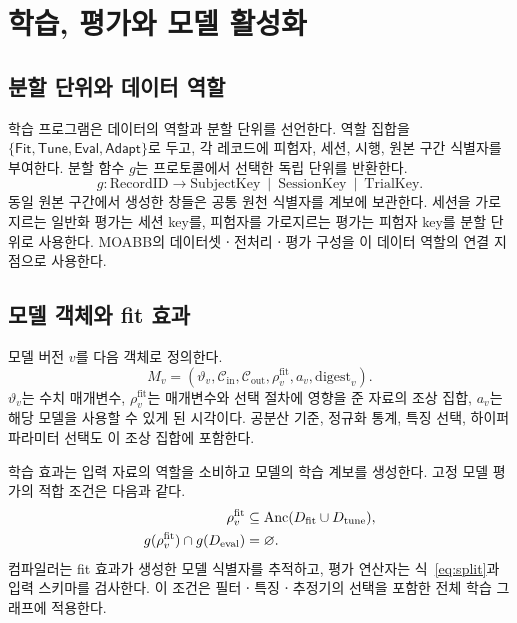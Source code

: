 \section{학습, 평가와 모델 활성화}
\label{sec:learning}
\subsection{분할 단위와 데이터 역할}
학습 프로그램은 데이터의 역할과 분할 단위를 선언한다. 역할 집합을
$\{\mathsf{Fit},\mathsf{Tune},\mathsf{Eval},\mathsf{Adapt}\}$로 두고,
각 레코드에 피험자, 세션, 시행, 원본 구간 식별자를 부여한다.
분할 함수 $g$는 프로토콜에서 선택한 독립 단위를 반환한다.
\begin{equation}
 g:\mathrm{RecordID}\longrightarrow
 \mathrm{SubjectKey}\ \mid\ \mathrm{SessionKey}\ \mid\ \mathrm{TrialKey}.
\end{equation}
동일 원본 구간에서 생성한 창들은 공통 원천 식별자를 계보에 보관한다.
세션을 가로지르는 일반화 평가는 세션 key를,
피험자를 가로지르는 평가는 피험자 key를 분할 단위로 사용한다.
MOABB의 데이터셋ㆍ전처리ㆍ평가 구성을 이 데이터 역할의 연결 지점으로 사용한다\cite{moabb}.

\subsection{모델 객체와 fit 효과}
모델 버전 $v$를 다음 객체로 정의한다.
\begin{equation}
 M_v=(\vartheta_v,\mathcal C_{\mathrm{in}},\mathcal C_{\mathrm{out}},
      \rho_v^{\mathrm{fit}},a_v,\mathrm{digest}_v).
 \label{eq:model}
\end{equation}
$\vartheta_v$는 수치 매개변수, $\rho_v^{\mathrm{fit}}$는 매개변수와 선택 절차에
영향을 준 자료의 조상 집합, $a_v$는 해당 모델을 사용할 수 있게 된 시각이다.
공분산 기준, 정규화 통계, 특징 선택, 하이퍼파라미터 선택도 이 조상 집합에 포함한다.

학습 효과는 입력 자료의 역할을 소비하고 모델의 학습 계보를 생성한다.
고정 모델 평가의 적합 조건은 다음과 같다.
\begin{equation}
 \begin{aligned}
 \rho_v^{\mathrm{fit}}&\subseteq
 \operatorname{Anc}(D_{\mathrm{fit}}\cup D_{\mathrm{tune}}),\\
 g(\rho_v^{\mathrm{fit}})\cap g(D_{\mathrm{eval}})&=\varnothing.
 \end{aligned}
 \label{eq:split}
\end{equation}
컴파일러는 fit 효과가 생성한 모델 식별자를 추적하고, 평가 연산자는
식~\eqref{eq:split}과 입력 스키마를 검사한다.
이 조건은 필터ㆍ특징ㆍ추정기의 선택을 포함한 전체 학습 그래프에 적용한다.


